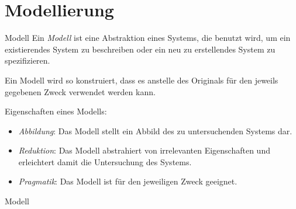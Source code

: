 \section{Modellierung}

\begin{defi}{Modell}
    Ein \emph{Modell} ist eine Abstraktion eines Systems, die benutzt wird, um ein existierendes System zu beschreiben oder ein neu zu erstellendes System zu spezifizieren.

    Ein Modell wird so konstruiert, dass es anstelle des Originals für den jeweils gegebenen Zweck verwendet werden kann.

    Eigenschaften eines Modells:
    \begin{itemize}
        \item \emph{Abbildung}: Das Modell stellt ein Abbild des zu untersuchenden Systems dar.
        \item \emph{Reduktion}: Das Modell abstrahiert von irrelevanten Eigenschaften und erleichtert damit die Untersuchung des Systems.
        \item \emph{Pragmatik}: Das Modell ist für den jeweiligen Zweck geeignet.
    \end{itemize}
\end{defi}

\begin{example}{Modell}
    \begin{center}
        \hspace{6em}
    \end{center}
\end{example}

